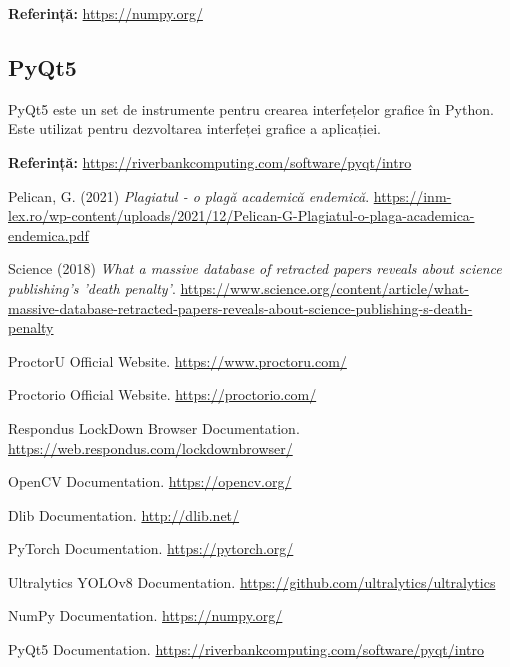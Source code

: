 \documentclass[12pt,a4paper]{article}
\begin{document}
\textbf{Referință:} \url{https://numpy.org/}

\subsection{PyQt5}
PyQt5 este un set de instrumente pentru crearea interfețelor grafice în Python. Este utilizat pentru dezvoltarea interfeței grafice a aplicației.

\textbf{Referință:} \url{https://riverbankcomputing.com/software/pyqt/intro}

\begin{thebibliography}{9}
Pelican, G. (2021) 
\textit{Plagiatul - o plagă academică endemică}. 
\url{https://inm-lex.ro/wp-content/uploads/2021/12/Pelican-G-Plagiatul-o-plaga-academica-endemica.pdf}

Science (2018)
\textit{What a massive database of retracted papers reveals about science publishing's 'death penalty'}.
\url{https://www.science.org/content/article/what-massive-database-retracted-papers-reveals-about-science-publishing-s-death-penalty}

ProctorU Official Website. 
\url{https://www.proctoru.com/}

Proctorio Official Website. 
\url{https://proctorio.com/}

Respondus LockDown Browser Documentation. 
\url{https://web.respondus.com/lockdownbrowser/}

OpenCV Documentation. 
\url{https://opencv.org/}

Dlib Documentation. 
\url{http://dlib.net/}

PyTorch Documentation. 
\url{https://pytorch.org/}

Ultralytics YOLOv8 Documentation. 
\url{https://github.com/ultralytics/ultralytics}

NumPy Documentation. 
\url{https://numpy.org/}

PyQt5 Documentation. 
\url{https://riverbankcomputing.com/software/pyqt/intro}
\end{thebibliography}
\end{document}
